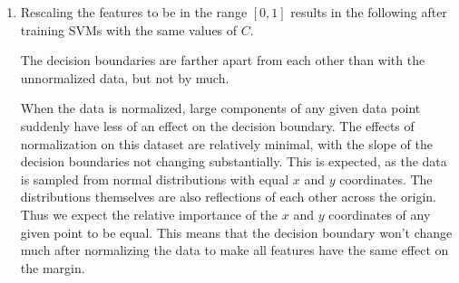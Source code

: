 \documentclass{article}
\begin{document}
\begin{enumerate}
\begin{enumerate}
			\item
				Rescaling the features to be in the range $[0,1]$ results in the following after training SVMs with the same values of $C$.
			\begin{figure}[H]
                                \centering
                        \end{figure}
			The decision boundaries are farther apart from each other than with the unnormalized data, but not by much.

			When the data is normalized, large components of any given data point suddenly have less of an effect on the decision boundary. The effects of normalization on this dataset are relatively minimal, with the slope of the decision boundaries not changing substantially. This is expected, as the data is sampled from normal distributions with equal $x$ and $y$ coordinates. The distributions themselves are also reflections of each other across the origin. Thus we expect the relative importance of the $x$ and $y$ coordinates of any given point to be equal. This means that the decision boundary won't change much after normalizing the data to make all features have the same effect on the margin.


\end{enumerate}
\end{enumerate}
\end{document}
